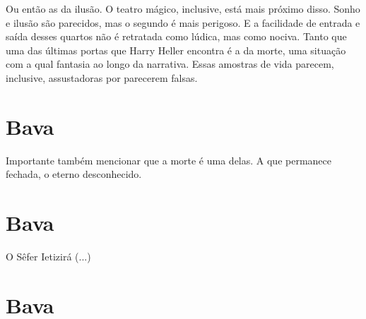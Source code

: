 Ou então as da ilusão. O teatro mágico, inclusive, está mais próximo disso. Sonho e ilusão são parecidos, mas o segundo é mais perigoso. E a facilidade de entrada e saída desses quartos não é retratada como lúdica, mas como nociva. Tanto que uma das últimas portas que Harry Heller encontra é a da morte, uma situação com a qual fantasia ao longo da narrativa. Essas amostras de vida parecem, inclusive, assustadoras por parecerem falsas.

\chapter*{Bava }
\smallskip{}

Importante também mencionar que a morte é uma delas. A que permanece fechada, o eterno desconhecido. 

\chapter*{Bava }
\smallskip{}

O Sêfer Ietizirá (...)

\chapter*{Bava }
\smallskip{}


